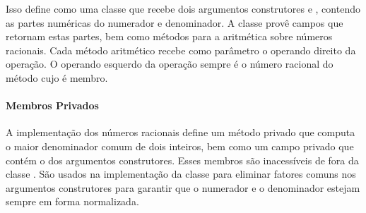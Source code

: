 Isso define  como uma classe que recebe dois argumentos 
construtores  e , contendo as partes num\'{e}ricas do numerador
e denominador. A classe prov\^{e} campos que retornam estas partes, bem como
m\'{e}todos para a aritm\'{e}tica sobre n\'{u}meros racionais. Cada m\'{e}todo aritm\'{e}tico 
recebe como par\^{a}metro o operando direito da opera\c{c}\~{a}o. O operando esquerdo
da opera\c{c}\~{a}o sempre \'{e} o n\'{u}mero racional do m\'{e}todo cujo \'{e} membro.   

\paragraph{Membros Privados}
A implementa\c{c}\~{a}o dos n\'{u}meros racionais define um m\'{e}todo privado  que 
computa o maior denominador comum de dois inteiros, bem como um campo
privado  que cont\'{e}m o  dos argumentos construtores. Esses
membros s\~{a}o inacess\'{i}veis de fora da classe . S\~{a}o usados na 
implementa\c{c}\~{a}o da classe para eliminar fatores comuns nos argumentos construtores
para garantir que o numerador e o denominador estejam sempre em forma normalizada.    

